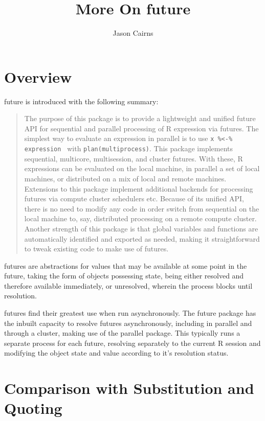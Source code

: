\documentclass[10pt,a4paper]{article}
\begin{document}
\title{More On future}
\author{Jason Cairns}
  
\maketitle{}

\section{Overview}
\label{sec:overview}
\nocite{bengtsson19:_futur_r}

future is introduced with the following summary: \blockquote{The
  purpose of this package is to provide a lightweight and unified
  future API for sequential and parallel processing of R expression
  via futures. The simplest way to evaluate an expression in parallel
  is to use \texttt{x \%<-\% { expression }} with
  \texttt{plan(multiprocess)}. This package implements sequential,
  multicore, multisession, and cluster futures. With these, R
  expressions can be evaluated on the local machine, in parallel a set
  of local machines, or distributed on a mix of local and remote
  machines. Extensions to this package implement additional backends
  for processing futures via compute cluster schedulers etc. Because
  of its unified API, there is no need to modify any code in order
  switch from sequential on the local machine to, say, distributed
  processing on a remote compute cluster. Another strength of this
  package is that global variables and functions are automatically
  identified and exported as needed, making it straightforward to
  tweak existing code to make use of futures.\cite{bengtsson20}}
futures are abstractions for values that may be available at some
point in the future, taking the form of objects possessing state,
being either resolved and therefore available immediately, or
unresolved, wherein the process blocks until resolution.

futures find their greatest use when run asynchronously. The future
package has the inbuilt capacity to resolve futures asynchronously,
including in parallel and through a cluster, making use of the
parallel package. This typically runs a separate process for each
future, resolving separately to the current R session and modifying
the object state and value according to it's resolution status.

\section{Comparison with Substitution and Quoting}
\label{sec:comparison-with-non}
\end{document}

